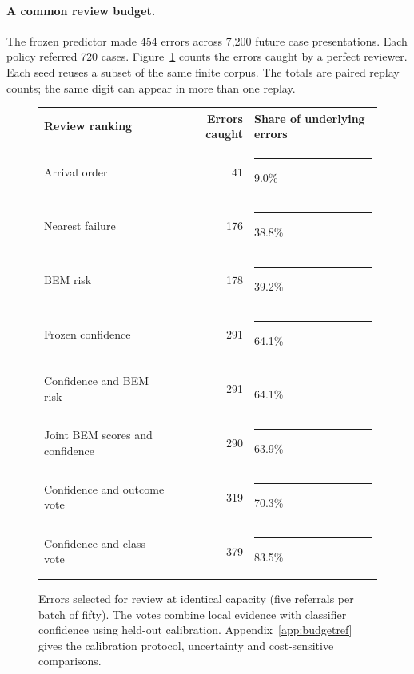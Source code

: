 \paragraph{A common review budget.}
The frozen predictor made 454 errors across 7,200 future case presentations. Each policy referred 720 cases. Figure~\ref{fig:review} counts the errors caught by a perfect reviewer. Each seed reuses a subset of the same finite corpus. The totals are paired replay counts; the same digit can appear in more than one replay.
\begin{figure}[htbp]\centering
\begin{tabular}{@{}lrl@{}}\toprule
Review ranking & Errors caught & Share of underlying errors\\\midrule
Arrival order & 41 & \textcolor{teal!70!black}{\rule{2.80mm}{1.25ex}}\hspace{0.45em}9.0\%\\
Nearest failure & 176 & \textcolor{teal!70!black}{\rule{12.02mm}{1.25ex}}\hspace{0.45em}38.8\%\\
BEM risk & 178 & \textcolor{teal!70!black}{\rule{12.15mm}{1.25ex}}\hspace{0.45em}39.2\%\\
Frozen confidence & 291 & \textcolor{teal!70!black}{\rule{19.87mm}{1.25ex}}\hspace{0.45em}64.1\%\\
Confidence and BEM risk & 291 & \textcolor{teal!70!black}{\rule{19.87mm}{1.25ex}}\hspace{0.45em}64.1\%\\
Joint BEM scores and confidence & 290 & \textcolor{teal!70!black}{\rule{19.80mm}{1.25ex}}\hspace{0.45em}63.9\%\\
Confidence and outcome vote & 319 & \textcolor{teal!70!black}{\rule{21.78mm}{1.25ex}}\hspace{0.45em}70.3\%\\
Confidence and class vote & 379 & \textcolor{teal!70!black}{\rule{25.88mm}{1.25ex}}\hspace{0.45em}83.5\%\\
\bottomrule\end{tabular}
\caption{Errors selected for review at identical capacity (five referrals per batch of fifty). The votes combine local evidence with classifier confidence using held-out calibration. Appendix~\ref{app:budgetref} gives the calibration protocol, uncertainty and cost-sensitive comparisons.}
\label{fig:review}\end{figure}
